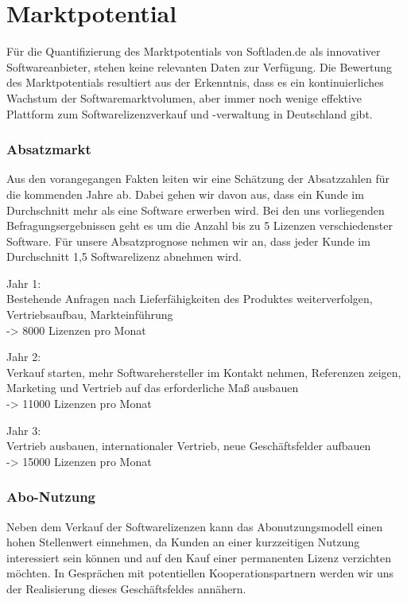 \section{Marktpotential}
Für die Quantifizierung des Marktpotentials von Softladen.de als innovativer Softwareanbieter, stehen keine relevanten Daten zur Verfügung. Die Bewertung des Marktpotentials resultiert aus der Erkenntnis, dass es ein kontinuierliches Wachstum der  Softwaremarktvolumen, aber immer noch wenige effektive Plattform zum Softwarelizenzverkauf und -verwaltung in Deutschland gibt.

\subsubsection{Absatzmarkt}
Aus den vorangegangen Fakten leiten wir eine Schätzung der Absatzzahlen für die kommenden Jahre ab. Dabei gehen wir davon aus, dass ein Kunde im Durchschnitt mehr als eine Software erwerben wird. Bei den uns vorliegenden Befragungsergebnissen geht es um die Anzahl bis zu 5 Lizenzen verschiedenster Software. Für unsere Absatzprognose nehmen wir an, dass jeder Kunde im Durchschnitt 1,5 Softwarelizenz abnehmen wird.

Jahr 1:\\
Bestehende Anfragen nach Lieferfähigkeiten des Produktes weiterverfolgen, Vertriebsaufbau, Markteinführung\\
-> 8000 Lizenzen pro Monat

Jahr 2:\\
Verkauf starten, mehr Softwarehersteller im Kontakt nehmen, Referenzen zeigen, Marketing und Vertrieb auf das erforderliche Maß ausbauen\\
-> 11000 Lizenzen pro Monat

Jahr 3:\\
Vertrieb ausbauen, internationaler Vertrieb, neue Geschäftsfelder aufbauen\\
-> 15000 Lizenzen pro Monat

\subsubsection{Abo-Nutzung}
Neben dem Verkauf der Softwarelizenzen kann das Abonutzungsmodell einen hohen Stellenwert einnehmen, da Kunden an einer kurzzeitigen Nutzung interessiert sein können und auf den Kauf einer permanenten Lizenz verzichten möchten. In Gesprächen mit potentiellen Kooperationspartnern werden wir uns der Realisierung dieses Geschäftsfeldes annähern.

